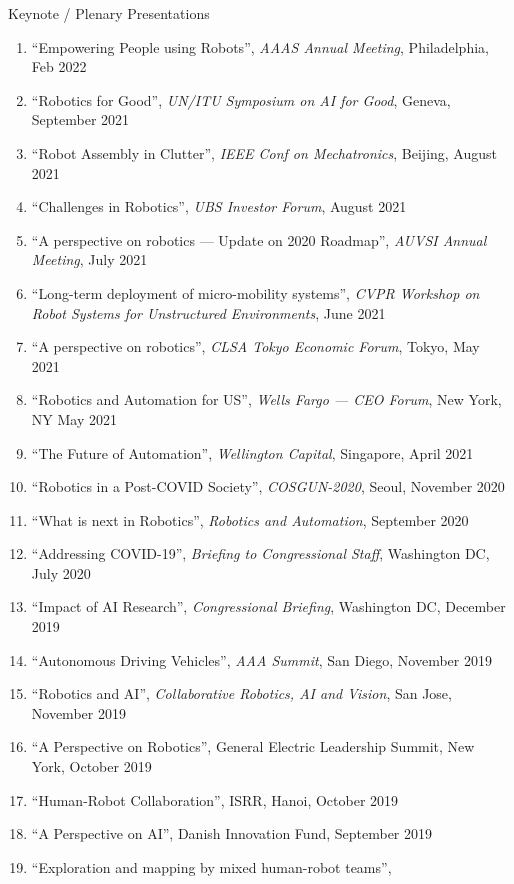 \documentclass{article}
\begin{document}
\begin{cv}
\begin{cvlist}{Keynote / Plenary Presentations}
\begin{enumerate}
			\item ``Empowering People using Robots'', {\em AAAS Annual Meeting},
			      Philadelphia, Feb 2022
			\item ``Robotics for Good'', {\em UN/ITU Symposium on AI for Good}, Geneva,
			      September 2021
			\item ``Robot Assembly in Clutter'', {\em IEEE Conf on Mechatronics}, Beijing,
			      August 2021
			\item ``Challenges in Robotics'', {\em UBS Investor Forum}, August 2021
			\item ``A perspective on robotics --- Update on 2020 Roadmap'', {\em AUVSI
					      Annual Meeting}, July 2021
			\item ``Long-term deployment of micro-mobility systems'', {\em CVPR Workshop on
					      Robot Systems for Unstructured Environments}, June 2021
			\item ``A perspective on robotics'', {\em CLSA Tokyo Economic Forum}, Tokyo, May
			      2021
			\item ``Robotics and Automation for US'', {\em Wells Fargo --- CEO Forum}, New
			      York, NY May 2021
			\item ``The Future of Automation'', {\em Wellington Capital}, Singapore,
			      April 2021
			\item ``Robotics in a Post-COVID Society'', {\em COSGUN-2020}, Seoul, November
			      2020
			\item ``What is next in Robotics'', {\em Robotics and Automation}, September
			      2020
			\item ``Addressing COVID-19'', {\em Briefing to Congressional Staff}, Washington
			      DC, July 2020
			\item ``Impact of AI Research'', {\em Congressional Briefing}, Washington DC,
			      December 2019
			\item ``Autonomous Driving Vehicles'', {\em AAA Summit}, San Diego, November
			      2019
			\item ``Robotics and AI'', {\em Collaborative Robotics, AI and Vision}, San
			      Jose, November 2019
			\item ``A Perspective on Robotics'', General Electric Leadership Summit, New
			      York, October 2019
			\item ``Human-Robot Collaboration'', ISRR, Hanoi, October 2019
			\item ``A Perspective on AI'', Danish Innovation Fund, September 2019
			\item ``Exploration and mapping by mixed human-robot teams'', {\em
}
\end{enumerate}
\end{cvlist}
\end{cv}
\end{document}
